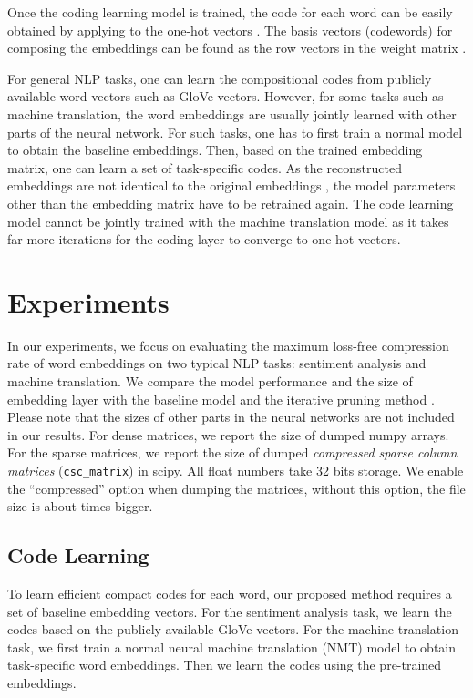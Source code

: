\documentclass{article} \usepackage{iclr2018_conference_review,times}
\begin{document}
Once the coding learning model is trained, the code  for each word can be easily obtained by applying  to the one-hot vectors . The basis vectors (codewords) for composing the embeddings can be found as the row vectors in the weight matrix .

For general NLP tasks, one can learn the compositional codes from publicly available word vectors such as GloVe vectors. However, for some tasks such as machine translation, the word embeddings are usually jointly learned with other parts of the neural network. For such tasks, one has to first train a normal model to obtain the baseline embeddings. Then, based on the trained embedding matrix, one can learn a set of task-specific codes. As the reconstructed embeddings  are not identical to the original embeddings , the model parameters other than the embedding matrix have to be retrained again. The code learning model cannot be jointly trained with the machine translation model as it takes far more iterations for the coding layer to converge to one-hot vectors. 



\section{Experiments}



In our experiments, we focus on evaluating the maximum loss-free compression rate of word embeddings on two typical NLP tasks: sentiment analysis and machine translation. We compare the model performance and the size of embedding layer with the baseline model and the iterative pruning method \citep{Han2015LearningBW}. Please note that the sizes of other parts in the neural networks are not included in our results. For dense matrices, we report the size of dumped numpy arrays. For the sparse matrices, we report the size of dumped {\it compressed sparse column matrices} (\texttt{\small csc\_matrix}) in scipy. All float numbers take 32 bits storage. We enable the ``compressed'' option when dumping the matrices, without this option, the file size is about  times bigger.

\subsection{Code Learning}

To learn efficient compact codes for each word, our proposed method requires a set of baseline embedding vectors. For the sentiment analysis task, we learn the codes based on the publicly available GloVe vectors. For the machine translation task, we first train a normal neural machine translation (NMT) model to obtain task-specific word embeddings. Then we learn the codes using the pre-trained embeddings.
\end{document}
